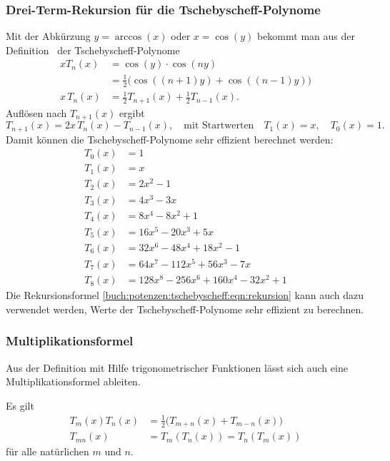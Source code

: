 \subsubsection{Drei-Term-Rekursion für die Tschebyscheff-Polynome}
Mit der Abkürzung $y=\arccos(x)$ oder $x=\cos(y)$ bekommt man aus
der Definition~\label{buch:potenzen:def:tschebyscheff}
der Tschebyscheff-Polynome
\begin{align*}
xT_n(x)
&=
\cos(y)\cdot \cos(ny)
\\
&=
\frac12\bigl(
\cos((n+1)y) + \cos((n-1)y)
\bigr)
\\
x\,T_n(x)
&=
\frac12 T_{n+1}(x) + \frac12 T_{n-1}(x).
\end{align*}
Auflösen nach $T_{n+1}(x)$ ergibt
\begin{equation}
T_{n+1}(x) = 2x\,T_n(x)-T_{n-1}(x),
\quad
\text{mit Startwerten}
\quad T_1(x)=x,
\quad
T_0(x)=1.
\label{buch:potenzen:tschebyscheff:eqn:rekursion}
\end{equation}
Damit können die Tschebyscheff-Polynome sehr effizient berechnet werden:
\begin{equation}
\begin{aligned}
T_0(x)
&=1
\\
T_1(x)
&=
x
\\
T_2(x)
&=
2x^2-1
\\
T_3(x)
&=
4x^3-3x
\\
T_4(x)
&=
8x^4-8x^2+1
\\
T_5(x)
&=
16x^5-20x^3+5x
\\
T_6(x)
&=
32x^6-48x^4+18x^2-1
\\
T_7(x)
&=
64x^7-112x^5+56x^3-7x
\\
T_8(x)
&=
128x^8-256x^6+160x^4-32x^2+1
\end{aligned}
\end{equation}
Die Rekursionsformel
\eqref{buch:potenzen:tschebyscheff:eqn:rekursion}
kann auch dazu verwendet werden, Werte der Tschebyscheff-Polynome
sehr effizient zu berechnen.

%
%
\subsubsection{Multiplikationsformel}
Aus der Definition mit Hilfe trigonometrischer Funktionen
lässt sich auch eine Multiplikationsformel ableiten.
%

\begin{satz}
%
Es gilt
\begin{align}
T_m(x)T_n(x)&=\frac12\bigl(T_{m+n}(x) + T_{m-n}(x)\bigr)
\label{buch:potenzen:tschebyscheff:mult1}
\\
T_{mn}(x) &= T_m(T_n(x)) = T_n(T_m(x))
\label{buch:potenzen:tschebyscheff:mult2}
\end{align}
für alle natürlichen $m$ und $n$.
\end{satz}

